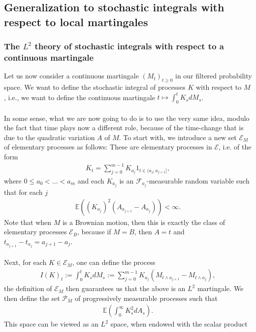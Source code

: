 \documentclass[../mainfile.tex]{subfiles}
\begin{document}
\subsection{Generalization to stochastic integrals with respect to local martingales}
\subsubsection{The $L^2$ theory of stochastic integrals with respect to a continuous martingale} Let us now consider a continuous martingale $(M_t)_{t \geq 0}$ in our filtered probability space. We want to define the stochastic integral of processes $K$ with respect to $M$, i.e., we want to define the continuous martingale $t \mapsto \int_0^t K_s dM_s$.\\
\\
In some sense, what we are now going to do is to use the very same idea, modulo the fact that time plays now a different role, because of the time-change that is due to the quadratic variation $A$ of $M$. To start with, we introduce a new set $\mathcal{E}_M$ of elementary processes as follows: These are elementary processes in $\mathcal{E}$, i.e. of the form 
\begin{align*}
K_t = \sum_{j=0}^{m-1} K_{a_j} 1_{t \in (a_j, a_{j+1}]},
\end{align*}
where $0 \leq a_0 < \dots < a_m$ and each $K_{a_j}$ is an $\mathcal{F}_{a_j}$-measurable random variable such that for each $j$
\begin{align*}
\mathbb{E}((K_{a_j})^2(A_{a_{j+1}}-A_{a_j})) < \infty. 
\end{align*}
Note that when $M$ is a Brownian motion, then this is exactly the class of elementary processes $\mathcal{E}_B$, because if $M=B$, then $A=t$ and $t_{a_{j+1}}-t_{a_j}=a_{j+1}-a_j$. \\
\\
Next, for each $K \in \mathcal{E}_M$,  one can define the process
\begin{align*}
I(K)_t := \int_0^t K_s dM_s:= \sum_{j=0}^{m-1} K_{a_j} ( M_{t \wedge a_{j+1}}-M_{t \wedge a_j}),
\end{align*}
the definition of $\mathcal{E}_M$ then guarantees us that the above is an $L^2$ martingale. We then define the set $\mathcal{P}_M$ of progressively measurable processes such that 
\begin{align*}
\mathbb{E}\left( \int_0^\infty K_s^2 dA_s \right).
\end{align*}
This space can be viewed as an $L^2$ space, when endowed with the scalar product 
\end{document}
